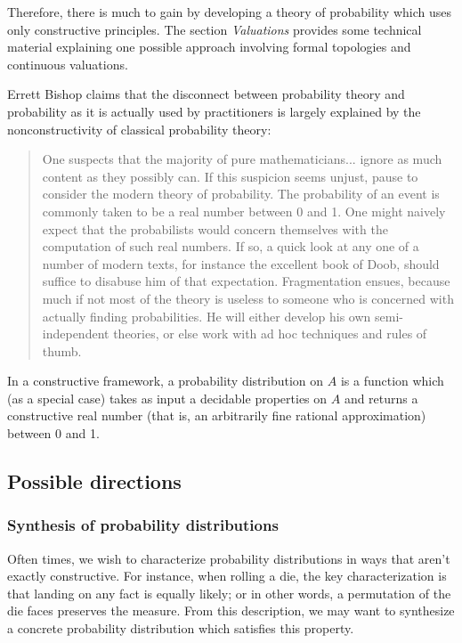 \documentclass{article}           %
\begin{document}
Therefore, there is much to gain by developing a theory of probability which uses only constructive principles. The section \emph{Valuations} provides some technical material explaining one possible approach involving formal topologies and continuous valuations.

Errett Bishop claims that the disconnect between probability theory and probability as it is actually used by practitioners is largely explained by the nonconstructivity of classical probability theory\cite{bishop1973}:

\begin{quote}
One suspects that the majority of pure mathematicians... ignore as much content as they possibly can. If this suspicion seems unjust, pause to consider the modern theory of probability. The probability of an event is commonly taken to be a real number between 0 and 1. One might naively expect that the probabilists would concern themselves with the computation of such real numbers. If so, a quick look at any one of a number of modern texts, for instance the excellent book of Doob, should suffice to disabuse him of that expectation. Fragmentation ensues, because much if not most of the theory is useless to someone who is concerned with actually finding probabilities. He will either develop his own semi-independent theories, or else work with ad hoc techniques and rules of thumb.
\end{quote}

In a constructive framework, a probability distribution on $A$ is a function which (as a special case) takes as input a decidable properties on $A$ and returns a constructive real number (that is, an arbitrarily fine rational approximation) between 0 and 1. 

\subsection{Possible directions}

\subsubsection{Synthesis of probability distributions}

Often times, we wish to characterize probability distributions in ways that aren't exactly constructive. For instance, when rolling a die, the key characterization is that landing on any fact is equally likely; or in other words, a permutation of the die faces preserves the measure. From this description, we may want to synthesize a concrete probability distribution which satisfies this property.
\end{document}
